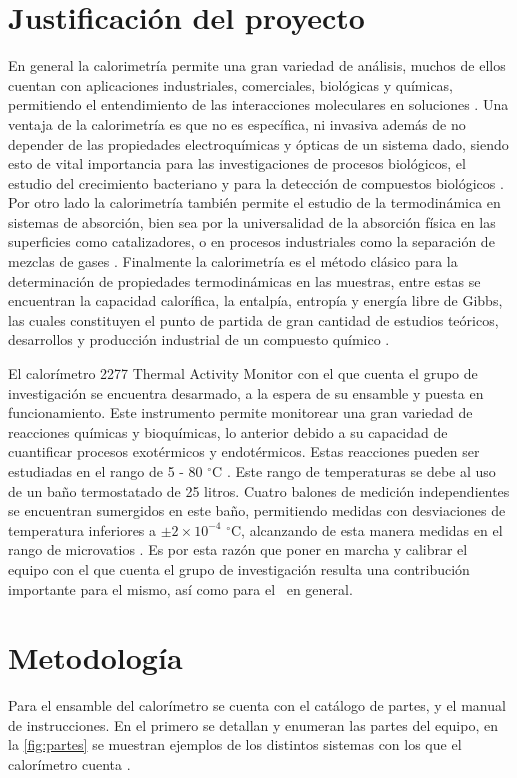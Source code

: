 \section{Justificación del proyecto}
	En general la calorimetría permite una gran variedad de análisis, muchos de ellos cuentan con aplicaciones industriales, comerciales, biológicas y químicas, permitiendo el entendimiento de las interacciones moleculares en soluciones \cite{blandamer1998titration}. Una ventaja de la calorimetría es que no es específica, ni invasiva además de no depender de las propiedades electroquímicas y ópticas de un sistema dado, siendo esto de vital importancia para las investigaciones de procesos biológicos, el estudio del crecimiento bacteriano y para la detección de compuestos biológicos \cite{winkelmann2004application}. Por otro lado la calorimetría también permite el estudio de la termodinámica en sistemas de absorción, bien sea por la universalidad de la absorción física en las superficies como catalizadores, o en procesos industriales como la separación de mezclas de gases \cite{morrison1987calorimetry}. Finalmente la calorimetría es el método clásico para la determinación de propiedades termodinámicas en las muestras, entre estas se encuentran la capacidad calorífica, la entalpía, entropía y energía libre de Gibbs, las cuales constituyen el punto de partida de gran cantidad de estudios teóricos, desarrollos y producción industrial de un compuesto químico \cite{wang2005determination, gaisford2016principles}.

	El calorímetro 2277 Thermal Activity Monitor con el que cuenta el grupo de investigación se encuentra desarmado, a la espera de su ensamble y puesta en funcionamiento. Este instrumento permite monitorear una gran variedad de reacciones químicas y bioquímicas, lo anterior debido a su capacidad de cuantificar procesos exotérmicos y endotérmicos. Estas reacciones pueden ser estudiadas en el rango de 5 - 80 $^\circ$C \cite{Suurkuusk}. Este rango de temperaturas se debe al uso de un baño termostatado de 25 litros. Cuatro balones de medición independientes se encuentran sumergidos en este baño, permitiendo medidas con desviaciones de temperatura inferiores a $\pm2\times10^{-4}$ $^\circ$C, alcanzando de esta manera medidas en el rango de microvatios \cite{Suurkuusk}. Es por esta razón que poner en marcha y calibrar el equipo con el que cuenta el grupo de investigación resulta una contribución importante para el mismo, así como para el \deptname\ en general.
	
\section{Metodología}
	Para el ensamble del calorímetro se cuenta con el catálogo de partes, y el manual de instrucciones. En el primero se detallan y enumeran las partes del equipo, en la \autoref{fig:partes} se muestran ejemplos de los distintos sistemas con los que el calorímetro cuenta \cite{Suurkuusk}. 
	
